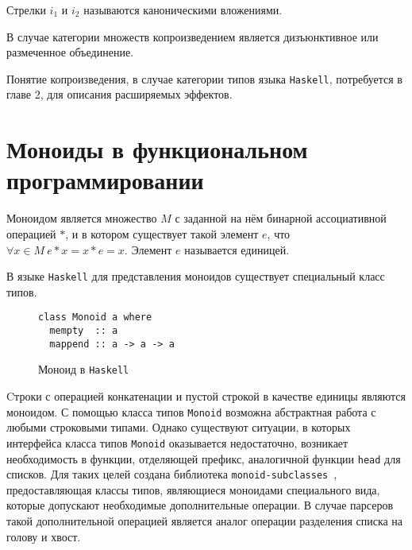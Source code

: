 \begin{center}
\end{center}

Стрелки $i_1$ и $i_2$ называются каноническими вложениями.

В случае категории множеств копроизведением является дизъюнктивное
или размеченное объединение.

Понятие копроизведения, в случае категории типов языка \lstinline{Haskell},
потребуется в главе 2, для описания расширяемых эффектов.

\section{Моноиды в функциональном программировании}

Моноидом является множество $M$ с заданной на нём бинарной ассоциативной
операцией $*$, и в котором существует такой элемент
$e$, что $\forall x \in M~e*x = x*e = x$. Элемент $e$ называется единицей.

В языке \lstinline{Haskell} для представления моноидов существует специальный
класс типов.

\begin{figure}[h]
\begin{lstlisting}
class Monoid a where
  mempty  :: a
  mappend :: a -> a -> a
\end{lstlisting}
\caption{Моноид в \lstinline{Haskell}}
\label{listing:Monoid}
\end{figure}

Cтроки с операцией конкатенации и пустой строкой в качестве единицы являются
моноидом. С помощью класса типов \lstinline{Monoid} возможна абстрактная работа
с любыми строковыми типами. Однако существуют ситуации, в которых интерфейса
класса типов \lstinline{Monoid} оказывается недостаточно, возникает
необходимость в функции, отделяющей префикс, аналогичной функции
\lstinline{head} для списков. Для таких целей создана библиотека
\lstinline{monoid-subclasses}~\cite{monoids}, предоставляющая
классы типов, являющиеся моноидами специального вида, которые допускают
необходимые дополнительные операции. В случае парсеров такой дополнительной
операцией является аналог операции разделения списка на голову и хвост.

